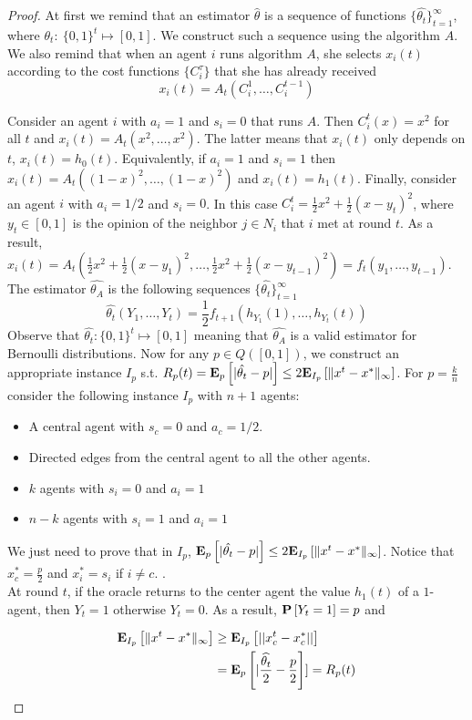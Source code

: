 \begin{proof}
  At first we remind that an estimator $\hat{\theta}$ is a sequence
  of functions $\{\hat{\theta_t}\}_{t=1}^{\infty}$, where
  $\theta_t:~\{0,1\}^t\mapsto [0,1]$.  We construct such a sequence using the
  algorithm $A$.  We also remind that when an agent $i$ runs algorithm $A$, she
  selects $x_i(t)$ according to the cost functions $\{C_i^{\tau}\}$ that she
  has already received \[x_i(t)=A_t(C_i^1,\ldots,C_i^{t-1})\]

  Consider an agent $i$ with $a_i=1$ and $s_i=0$ that runs $A$. Then
  $C_i^t(x)=x^2$ for all $t$ and $x_i(t)=A_t(x^2,\ldots,x^2)$.  The latter
  means that $x_i(t)$ only depends on $t$, $x_i(t)=h_0(t)$. Equivalently, if
  $a_i=1$ and $s_i=1$ then $x_i(t)=A_t((1-x)^2,\ldots,(1-x)^2)$ and
  $x_i(t)=h_1(t)$. Finally, consider an agent $i$ with $a_i=1/2$ and $s_i=0$.
  In this case $C_i^t = \frac{1}{2}x^2 + \frac{1}{2}(x-y_t)^2$, where $y_t \in
  [0,1]$ is the opinion of the neighbor $j\in N_i$ that $i$ met at round $t$.
  As a result, $x_i(t)=A_t(\frac{1}{2}x^2+\frac{1}{2}(x-y_1)^2,\ldots,
  \frac{1}{2}x^2+\frac{1}{2}(x-y_{t-1})^2)=f_t(y_1,\ldots,y_{t-1})$.  The
  estimator $\hat{\theta_A}$ is the following sequences
  $\{\hat{\theta_{t}}\}_{t=1}^{\infty}$
  \[
    \hat{\theta_t}(Y_1,\ldots,Y_t) =
    \frac{1}{2}f_{t+1}(h_{Y_1}(1),\ldots,h_{Y_t}(t))
  \]
  Observe that $\hat{\theta_t}: \{0,1\}^t \mapsto [0,1]$ meaning that
  $\hat{\theta_A}$ is a valid estimator for Bernoulli distributions.
  Now for any $p \in Q([0,1])$, we construct an appropriate instance
  $I_p$ s.t. $R_p(t)=\bm{\mathrm{E}}_{p} \left[ |\hat{\theta_t} - p| \right] \leq
  2\bm{\mathrm{E}}_{I_p} \left[ \| x^t-x^* \|_{\infty} \right]$.  For $p=\frac{k}{n}$ consider the
  following instance $I_p$ with $n+1$ agents:

  \begin{itemize}
    \item A central agent with $s_c=0$ and $a_c=1/2$.

    \item Directed edges from the central agent to all the other agents.

    \item $k$ agents with $s_i=0$ and $a_i=1$

    \item $n-k$ agents with $s_i=1$ and $a_i=1$
  \end{itemize}

  We just need to prove that in $I_p$, $\bm{\mathrm{E}}_{p} \left[ |\hat{\theta_t}-p| \right] \leq
  2\bm{\mathrm{E}}_{I_p} \left[ \| x^t-x^* \|_{\infty} \right]$. Notice that $x^*_c=\frac{p}{2}$ and
  $x^*_i=s_i$ if $i\neq c$. .\\ At round $t$, if the oracle returns to the
  center agent the value $h_1(t)$ of a $1$-agent, then $Y_t=1$ otherwise
  $Y_t=0$. As a result, $\bm{\mathrm{P}}\left[Y_t=1\right]=p$ and

  \begin{align*}
    \bm{\mathrm{E}}_{I_p} \left[ \| x^t-x^* \|_{\infty} \right]
    &\geq
    \bm{\mathrm{E}}_{I_p} \left[ ||x^t_c-x^*_c|| \right]\\
    &=
    \bm{\mathrm{E}}_{p} \left[ |\frac{\widehat{\theta_t}}{2}-\frac{p}{2} \right]] = R_p(t)
  \end{align*} \end{proof}

